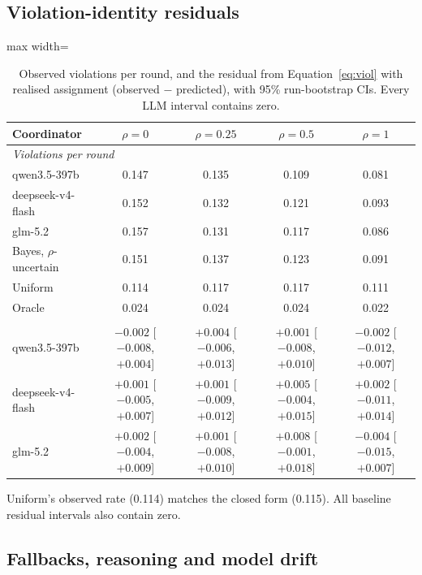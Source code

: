 \documentclass[11pt,letterpaper]{article}
\numberwithin{equation}{section}
\numberwithin{table}{section}
\numberwithin{figure}{section}
\numberwithin{algorithm}{section}
\begin{document}
\subsection{Violation-identity residuals}\label{app:resid}

\begin{table}[h]
\centering\small
\caption{Observed violations per round, and the residual from Equation~\eqref{eq:viol} with realised assignment (observed $-$ predicted), with 95\% run-bootstrap CIs. Every LLM interval contains zero.}
\label{tab:resid}
\begin{adjustbox}{max width=\linewidth}
\begin{tabular}{lcccc}
\toprule
Coordinator & $\rho=0$ & $\rho=0.25$ & $\rho=0.5$ & $\rho=1$ \\
\midrule
\multicolumn{5}{l}{\emph{Violations per round}} \\
qwen3.5-397b & 0.147 & 0.135 & 0.109 & 0.081 \\
deepseek-v4-flash & 0.152 & 0.132 & 0.121 & 0.093 \\
glm-5.2 & 0.157 & 0.131 & 0.117 & 0.086 \\
Bayes, $\rho$-uncertain & 0.151 & 0.137 & 0.123 & 0.091 \\
Uniform & 0.114 & 0.117 & 0.117 & 0.111 \\
Oracle & 0.024 & 0.024 & 0.024 & 0.022 \\
\addlinespace
\multicolumn{5}{l}{\emph{Residual}} \\
qwen3.5-397b & $-0.002$ [$-0.008$, $+0.004$] & $+0.004$ [$-0.006$, $+0.013$] & $+0.001$ [$-0.008$, $+0.010$] & $-0.002$ [$-0.012$, $+0.007$] \\
deepseek-v4-flash & $+0.001$ [$-0.005$, $+0.007$] & $+0.001$ [$-0.009$, $+0.012$] & $+0.005$ [$-0.004$, $+0.015$] & $+0.002$ [$-0.011$, $+0.014$] \\
glm-5.2 & $+0.002$ [$-0.004$, $+0.009$] & $+0.001$ [$-0.008$, $+0.010$] & $+0.008$ [$-0.001$, $+0.018$] & $-0.004$ [$-0.015$, $+0.007$] \\
\bottomrule
\end{tabular}
\end{adjustbox}
\end{table}

\noindent Uniform's observed rate (0.114) matches the closed form (0.115). All baseline residual intervals also contain zero.

\subsection{Fallbacks, reasoning and model drift}
\end{document}
